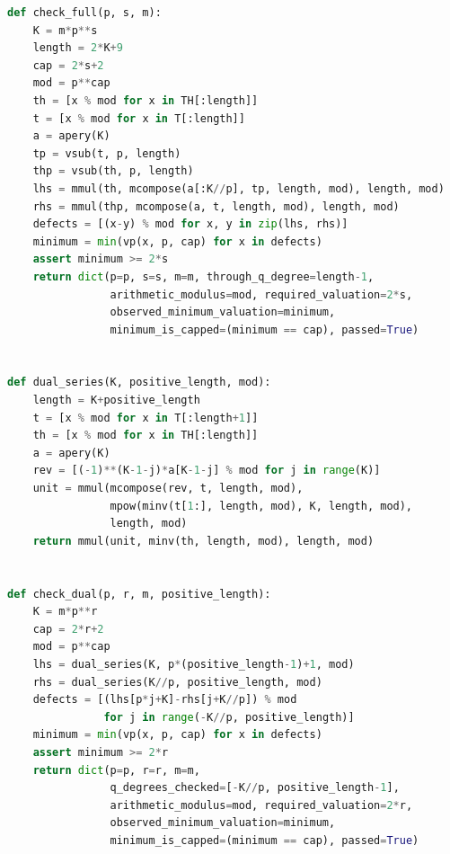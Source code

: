 \documentclass[11pt,a4paper]{article}
\theoremstyle{definition}\newtheorem{definition}[theorem]{Definition}
\theoremstyle{remark}\newtheorem{remark}[theorem]{Remark}
\numberwithin{equation}{section}
\begin{document}
\begin{lstlisting}[language=Python]
def check_full(p, s, m):
    K = m*p**s
    length = 2*K+9
    cap = 2*s+2
    mod = p**cap
    th = [x % mod for x in TH[:length]]
    t = [x % mod for x in T[:length]]
    a = apery(K)
    tp = vsub(t, p, length)
    thp = vsub(th, p, length)
    lhs = mmul(th, mcompose(a[:K//p], tp, length, mod), length, mod)
    rhs = mmul(thp, mcompose(a, t, length, mod), length, mod)
    defects = [(x-y) % mod for x, y in zip(lhs, rhs)]
    minimum = min(vp(x, p, cap) for x in defects)
    assert minimum >= 2*s
    return dict(p=p, s=s, m=m, through_q_degree=length-1,
                arithmetic_modulus=mod, required_valuation=2*s,
                observed_minimum_valuation=minimum,
                minimum_is_capped=(minimum == cap), passed=True)


def dual_series(K, positive_length, mod):
    length = K+positive_length
    t = [x % mod for x in T[:length+1]]
    th = [x % mod for x in TH[:length]]
    a = apery(K)
    rev = [(-1)**(K-1-j)*a[K-1-j] % mod for j in range(K)]
    unit = mmul(mcompose(rev, t, length, mod),
                mpow(minv(t[1:], length, mod), K, length, mod),
                length, mod)
    return mmul(unit, minv(th, length, mod), length, mod)


def check_dual(p, r, m, positive_length):
    K = m*p**r
    cap = 2*r+2
    mod = p**cap
    lhs = dual_series(K, p*(positive_length-1)+1, mod)
    rhs = dual_series(K//p, positive_length, mod)
    defects = [(lhs[p*j+K]-rhs[j+K//p]) % mod
               for j in range(-K//p, positive_length)]
    minimum = min(vp(x, p, cap) for x in defects)
    assert minimum >= 2*r
    return dict(p=p, r=r, m=m,
                q_degrees_checked=[-K//p, positive_length-1],
                arithmetic_modulus=mod, required_valuation=2*r,
                observed_minimum_valuation=minimum,
                minimum_is_capped=(minimum == cap), passed=True)



\end{lstlisting}
\end{document}
